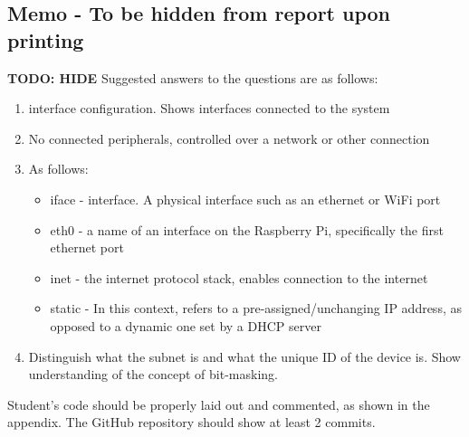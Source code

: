 \subsection{Memo - To be hidden from report upon printing}
\textbf{TODO: HIDE}
Suggested answers to the questions are as follows:
\begin{enumerate}
    \item interface configuration. Shows interfaces connected to the system
    \item No connected peripherals, controlled over a network or other connection
    \item As follows:
        \begin{itemize}
            \item iface - interface. A physical interface such as an ethernet or WiFi port
            \item eth0 - a name of an interface on the Raspberry Pi, specifically the first ethernet port
            \item inet - the internet protocol stack, enables connection to the internet
            \item static - In this context, refers to a pre-assigned/unchanging IP address, as opposed to a dynamic one set by a DHCP server
        \end{itemize}
    \item Distinguish what the subnet is and what the unique ID of the device is. Show understanding of the concept of bit-masking.
\end{enumerate}
Student's code should be properly laid out and commented, as shown in the appendix. The GitHub repository should show at least 2 commits.